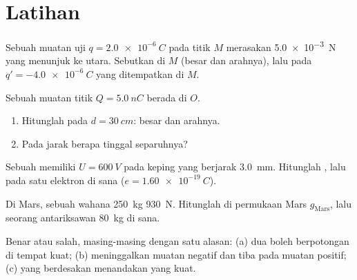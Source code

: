 \section{Latihan}

\begin{exercise}[$\star$]\label{exo:g11:electric-gravitational-fields:1}
Sebuah muatan uji $q = \qty{+2.0e-6}{C}$ pada titik $M$ merasakan 
\qty{5.0e-3}{N} yang menunjuk ke utara. Sebutkan  di $M$ (besar dan
arahnya), lalu  pada $q' = \qty{-4.0e-6}{C}$ yang ditempatkan di
$M$.
\end{exercise}

\begin{exercise}[$\star$]\label{exo:g11:electric-gravitational-fields:2}
Sebuah muatan titik $Q = \qty{+5.0}{nC}$ berada di $O$.
\begin{enumerate}
  \item Hitunglah  pada $d = \qty{30}{cm}$: besar dan arahnya.
  \item Pada jarak berapa  tinggal separuhnya?
\end{enumerate}
\end{exercise}

\begin{exercise}[$\star$]\label{exo:g11:electric-gravitational-fields:3}
Sebuah  memiliki $U = \qty{600}{V}$ pada keping yang berjarak
\qty{3.0}{mm}. Hitunglah , lalu  pada satu elektron di sana
($e = \qty{1.60e-19}{C}$).
\end{exercise}

\begin{exercise}[$\star$]\label{exo:g11:electric-gravitational-fields:4}
Di Mars, sebuah wahana \qty{250}{kg}  \qty{930}{N}. Hitunglah
 di permukaan Mars $g_{\text{Mars}}$, lalu  seorang
antariksawan \qty{80}{kg} di sana.
\end{exercise}

\begin{exercise}[$\star$]\label{exo:g11:electric-gravitational-fields:5}
Benar atau salah, masing-masing dengan satu alasan: (a) dua 
boleh berpotongan di tempat  kuat; (b)  meninggalkan
muatan negatif dan tiba pada muatan positif; (c)  yang
berdesakan menandakan  yang kuat.
\end{exercise}

